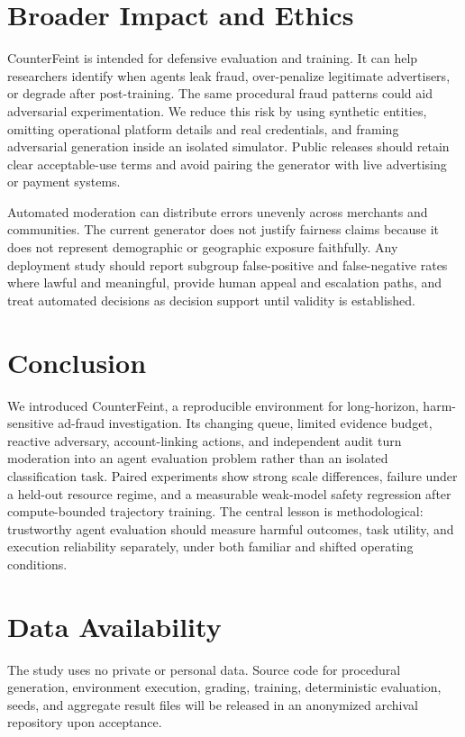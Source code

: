 \documentclass{article}
\begin{document}
\section{Broader Impact and Ethics}

CounterFeint is intended for defensive evaluation and training. It can help researchers identify when agents leak fraud, over-penalize legitimate advertisers, or degrade after post-training. The same procedural fraud patterns could aid adversarial experimentation. We reduce this risk by using synthetic entities, omitting operational platform details and real credentials, and framing adversarial generation inside an isolated simulator. Public releases should retain clear acceptable-use terms and avoid pairing the generator with live advertising or payment systems.

Automated moderation can distribute errors unevenly across merchants and communities. The current generator does not justify fairness claims because it does not represent demographic or geographic exposure faithfully. Any deployment study should report subgroup false-positive and false-negative rates where lawful and meaningful, provide human appeal and escalation paths, and treat automated decisions as decision support until validity is established.

\section{Conclusion}

We introduced CounterFeint, a reproducible environment for long-horizon, harm-sensitive ad-fraud investigation. Its changing queue, limited evidence budget, reactive adversary, account-linking actions, and independent audit turn moderation into an agent evaluation problem rather than an isolated classification task. Paired experiments show strong scale differences, failure under a held-out resource regime, and a measurable weak-model safety regression after compute-bounded trajectory training. The central lesson is methodological: trustworthy agent evaluation should measure harmful outcomes, task utility, and execution reliability separately, under both familiar and shifted operating conditions.

\section*{Data Availability}

The study uses no private or personal data. Source code for procedural generation, environment execution, grading, training, deterministic evaluation, seeds, and aggregate result files will be released in an anonymized archival repository upon acceptance.
\end{document}
